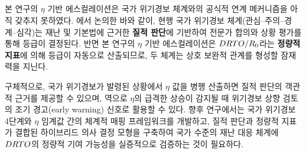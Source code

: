 \subsection{}
\label{subsec:lim-national-alert}

본 연구의 $\eta$ 기반 에스컬레이션은 국가 위기경보 체계와의 공식적 연계
메커니즘을 아직 갖추지 못하였다. 에서 논의한 바와 같이,
현행 국가 위기경보 체계(관심--주의--경계--심각)는
재난 및  기본법에 근거한 \textbf{질적 판단}에 기반하여
전문가 합의와 상황 평가를 통해 등급이 결정된다.
반면 본 연구의 $\eta$ 기반 에스컬레이션은
$DRTO / R_0$라는 \textbf{정량적 지표}에 의해 등급이 자동으로 산출되므로,
두 체계는 상호 보완적 관계를 형성할 잠재력을 지닌다.

구체적으로, 국가 위기경보가 발령된 상황에서 $\eta$ 값을 병행 산출하면
질적 판단의 객관적 근거를 제공할 수 있으며,
역으로 $\eta$의 급격한 상승이 감지될 때 위기경보 상향 검토의
조기 경고(early warning) 신호로 활용할 수 있다.
향후 연구에서는 국가 위기경보 4단계와 $\eta$ 임계값 간의
체계적 매핑 프레임워크를 개발하고,
질적 판단과 정량적 지표가 결합된 하이브리드 의사 결정 모형을 구축하여
국가 수준의 재난 대응 체계에 $DRTO$의 정량적 기여 가능성을
실증적으로 검증하는 것이 필요하다.


\syncr{\label{subsec:lim-operationalization}}


\vspace{1em}


